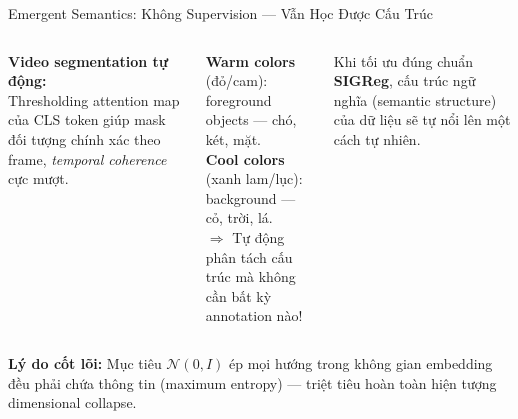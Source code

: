 \documentclass[aspectratio=169,9pt]{beamer}
\begin{document}
\begin{frame}{Emergent Semantics: Không Supervision — Vẫn Học Được Cấu Trúc}
\begin{columns}[T]
\vspace{0.8em}
\textbf{Video segmentation tự động:}\\[2pt]
Thresholding attention map của CLS token giúp mask đối tượng chính xác theo frame, \emph{temporal coherence} cực mượt.


\begin{goodbox}
\footnotesize \textbf{Warm colors} (đỏ/cam): foreground objects — chó, két, mặt.\\[5pt]
\textbf{Cool colors} (xanh lam/lục): background — cỏ, trời, lá.\\[5pt]
$\Rightarrow$ Tự động phân tách cấu trúc mà không cần bất kỳ annotation nào!
\end{goodbox}

\vspace{0.6em}
\begin{accentbox}
\footnotesize Khi tối ưu đúng chuẩn \textbf{SIGReg}, cấu trúc ngữ nghĩa (semantic structure) của dữ liệu sẽ tự nổi lên một cách tự nhiên.
\end{accentbox}

\end{columns}

\vspace{0.8em}
\begin{primarybox}
\footnotesize \textbf{Lý do cốt lõi:} Mục tiêu $\mathcal{N}(0,I)$ ép mọi hướng trong không gian embedding đều phải chứa thông tin (maximum entropy) — triệt tiêu hoàn toàn hiện tượng dimensional collapse.
\end{primarybox}
\end{frame}
\fi %

\end{document}
